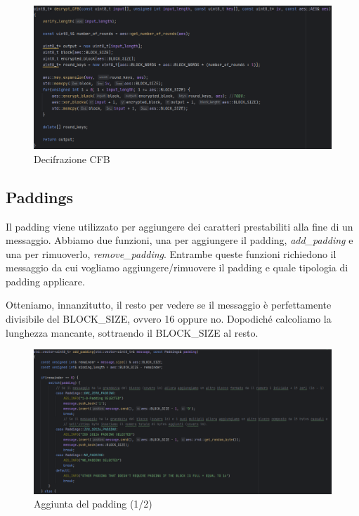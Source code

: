 \textsf{\small }

\begin{figure}[H]
	\centering
	\includegraphics[width=1\textwidth, height=1\textheight, keepaspectratio]{./images/code/cpp/modes/decrypt_CFB.PNG}
	\caption{Decifrazione CFB}
	\label{fig:decrypt_CFB}
\end{figure}

\subsection{Paddings}


\textsf{\small Il padding viene utilizzato per aggiungere dei caratteri prestabiliti alla fine di un messaggio. Abbiamo due funzioni, una per aggiungere il padding, \emph{add\_padding} e una per rimuoverlo, \emph{remove\_padding}. Entrambe queste funzioni richiedono il messaggio da cui vogliamo aggiungere/rimuovere il padding e quale tipologia di padding applicare.}

\textsf{\small Otteniamo, innanzitutto, il resto per vedere se il messaggio è perfettamente divisibile del BLOCK\_SIZE, ovvero 16 oppure no. Dopodiché calcoliamo la lunghezza mancante, sottraendo il BLOCK\_SIZE al resto.}

\begin{figure}[H]
	\centering
	\includegraphics[width=1\textwidth, height=1\textheight, keepaspectratio]{./images/code/cpp/padding/add_padding0.PNG}
	\caption{Aggiunta del padding (1/2)}
	\label{fig:add_padding0}
\end{figure}

